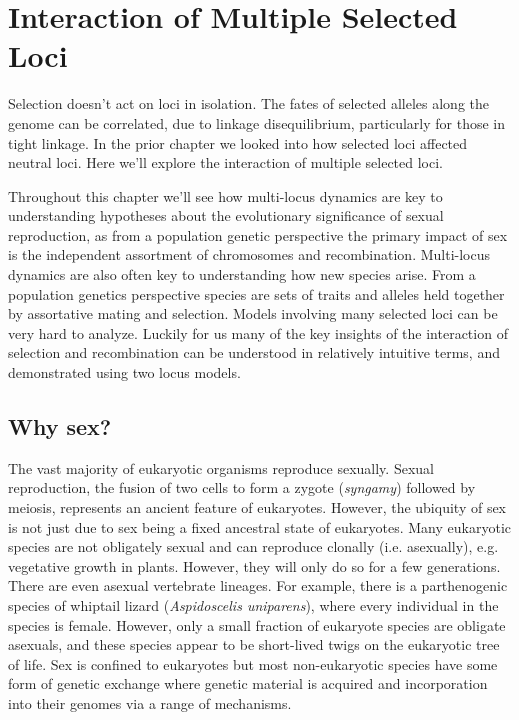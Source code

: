 \chapter{Interaction of Multiple Selected Loci}
Selection doesn't act on loci in isolation. The fates of selected alleles along the genome can be correlated, due to linkage disequilibrium, particularly for those in tight linkage. In the prior chapter we looked into how selected loci affected neutral loci. Here we'll explore the interaction of multiple selected loci. 

Throughout this chapter we'll see how multi-locus dynamics are key to understanding hypotheses about the evolutionary significance of sexual reproduction, as from a population genetic perspective the primary impact of sex is the independent assortment of chromosomes and recombination. Multi-locus dynamics are also often key to understanding how new species arise. From a population genetics perspective species are sets of traits and alleles held together by assortative mating and selection. 
Models involving many selected loci can be very hard to analyze. Luckily for us many of the key insights of the interaction of selection and recombination can be understood in relatively intuitive terms, and demonstrated using two locus models. 

\section{Why sex?}
The vast majority of eukaryotic organisms reproduce sexually. Sexual reproduction, the fusion of two cells to form a zygote  ({\it syngamy}) followed by meiosis, represents an ancient feature of eukaryotes. However, the ubiquity of sex is not just due to sex being a fixed ancestral state of eukaryotes. Many eukaryotic species are not obligately sexual and can reproduce clonally (i.e. asexually), e.g. vegetative growth in plants. However, they will only do so for a few generations. There are even asexual vertebrate lineages. For example, there is a parthenogenic species of whiptail lizard ({\it Aspidoscelis uniparens}), where every individual in the species is female.  However, only a small fraction of  eukaryote species are obligate asexuals, and these species appear to be short-lived twigs on the eukaryotic tree of life. 
Sex is confined to eukaryotes but most non-eukaryotic species have some form of genetic exchange where genetic material is acquired and incorporation into their genomes via a range of mechanisms. 

